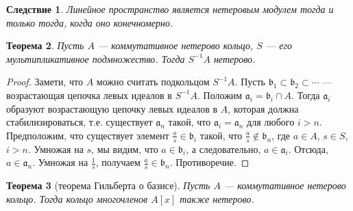 \documentclass[12pt, titlepage, oneside]{amsbook}
\newcommand{\aaa}{\mathfrak{a}}
\newcommand{\bbb}{\mathfrak{b}}
\newtheorem{theorem}{Теорема}[chapter]
\newtheorem{corollary}[theorem]{Следствие}
\theoremstyle{definition}
\theoremstyle{remark}
\begin{document}
\begin{corollary}
	\label{Net8a}
	Линейное пространство является нетеровым модулем тогда и только тогда, когда оно конечномерно.
\end{corollary}

\begin{theorem}
	\label{Net9}
	Пусть $A$ --- коммутативное нетерово кольцо, $S$ --- его мультипликативное подмножество. Тогда $S^{-1}A$ нетерово.
\end{theorem}

\begin{proof}
	Замети, что $A$ можно считать подкольцом $S^{-1}A$. Пусть $\bbb_1\subset\bbb_2\subset\cdots$ --- возрастающая цепочка левых идеалов в $S^{-1}A$. Положим $\aaa_i=\bbb_i\cap A$. Тогда $\aaa_i$ образуют возрастающую цепочку левых идеалов в $A$, которая должна стабилизироваться, т.е. существует $\aaa_n$ такой, что $\aaa_i=\aaa_n$ для любого $i>n$. Предположим, что существует элемент $\frac{a}{s}\in\bbb_i$ такой, что $\frac{a}{s}\not\in\bbb_n$, где $a\in A$, $s\in S$, $i>n$. Умножая на $s$, мы видим, что $a\in\bbb_i$, а следовательно, $a\in\aaa_i$. Отсюда, $a\in\aaa_n$. Умножая на $\frac{1}{s}$, получаем $\frac{a}{s}\in\bbb_n$. Противоречие.
\end{proof}

\begin{theorem}[теорема Гильберта о базисе]
	\label{Net10}
	Пусть $A$ --- коммутативное нетерово кольцо. Тогда кольцо многочленов $A[x]$ также нетерово.
\end{theorem}
\end{document}
